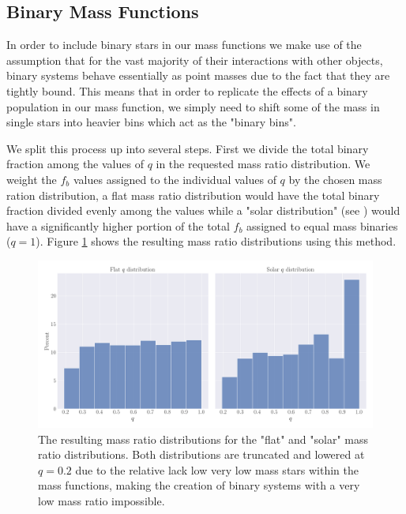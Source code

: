 \subsection{Binary Mass Functions}

In order to include binary stars in our mass functions we make use of the assumption that for the
vast majority of their interactions with other objects, binary systems behave essentially as point
masses due to the fact that they are tightly bound. This means that in order to replicate the
effects of a binary population in our mass function, we simply need to shift some of the mass in
single stars into heavier bins which act as the "binary bins".


We split this process up into several steps. First we divide the total binary fraction among the
values of $q$ in the requested mass ratio distribution. We weight the $f_b$ values assigned to the
individual values of $q$ by the chosen mass ration distribution, a flat mass ratio distribution
would have the total binary fraction divided evenly among the values while a "solar distribution"
(see \citealt{Fisher2005}) would have a significantly higher portion of the total $f_b$ assigned to
equal mass binaries ($q=1$). Figure \ref{fig:2/q-dists} shows the resulting mass ratio distributions
using this method.

\begin{figure}
    \centering
    \includegraphics[width=\textwidth]{figures/q-dists.png}
    \caption{The resulting mass ratio distributions for the "flat" and "solar" mass ratio
        distributions. Both distributions are truncated and lowered at $q=0.2$ due to the relative
        lack low very low mass stars within the mass functions, making the creation of binary
        systems with a very low mass ratio impossible.}
    \label{fig:2/q-dists}
\end{figure}


